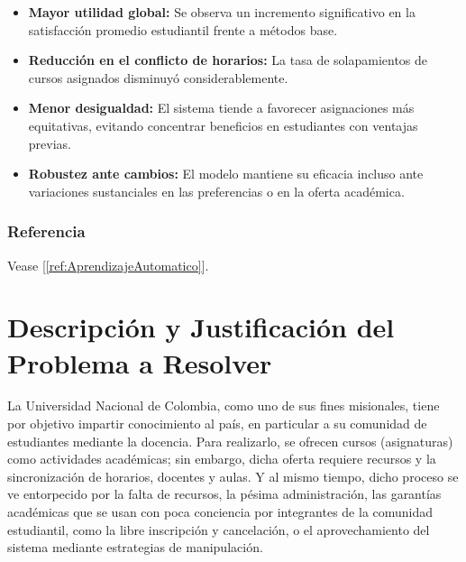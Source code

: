 \documentclass{article}
\begin{document}
\begin{itemize}
  \item \textbf{Mayor utilidad global:} Se observa un incremento significativo en la satisfacción promedio estudiantil frente a métodos base.
  \item \textbf{Reducción en el conflicto de horarios:} La tasa de solapamientos de cursos asignados disminuyó considerablemente.
  \item \textbf{Menor desigualdad:} El sistema tiende a favorecer asignaciones más equitativas, evitando concentrar beneficios en estudiantes con ventajas previas.
  \item \textbf{Robustez ante cambios:} El modelo mantiene su eficacia incluso ante variaciones sustanciales en las preferencias o en la oferta académica.
\end{itemize}

\subsubsection{Referencia}

Vease [\ref{ref:AprendizajeAutomatico}].




\section{Descripción y Justificación del Problema a Resolver}\label{sec:descr}

La Universidad Nacional de Colombia, como uno de sus fines misionales, tiene por objetivo impartir 
conocimiento al país, en particular a su comunidad de estudiantes mediante la docencia. Para 
realizarlo, se ofrecen cursos (asignaturas) como actividades académicas; sin embargo, dicha oferta 
requiere recursos y la sincronización de horarios, docentes y aulas. Y al mismo tiempo, dicho proceso 
se ve entorpecido por la falta de recursos, la pésima administración, las garantías académicas que se 
usan con poca conciencia por integrantes de la comunidad estudiantil, como la libre inscripción y 
cancelación, o el aprovechamiento del sistema mediante estrategias de manipulación.
\end{document}
